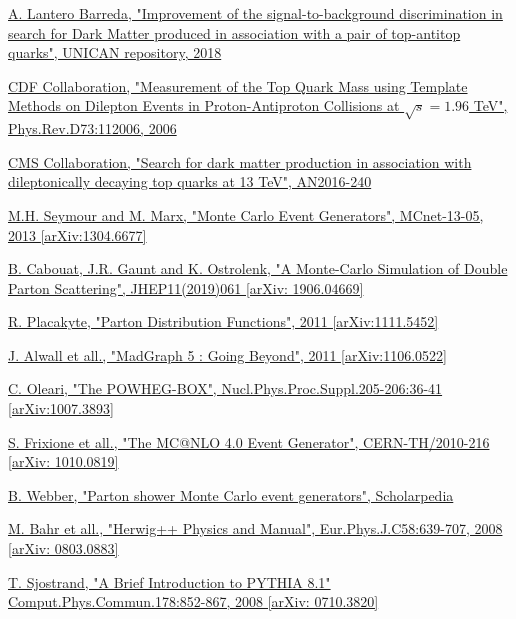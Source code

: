 \documentclass[a4paper, 10pt, openright]{report}
\begin{document}
\begin{thebibliography}{1}
\href{https://repositorio.unican.es/xmlui/bitstream/handle/10902/15648/Lantero\%20Barreda\%20Agustin.pdf}{A. Lantero Barreda,
"Improvement of the signal-to-background discrimination in search for Dark Matter produced in association with a pair of top-antitop quarks",
UNICAN repository, 2018}

\href{https://arxiv.org/abs/hep-ex/0602008}{CDF Collaboration,
"Measurement of the Top Quark Mass using Template Methods on Dilepton Events in Proton-Antiproton Collisions at $\sqrt{s} = 1.96$ TeV",
Phys.Rev.D73:112006, 2006}

\href{http://cms.cern.ch/iCMS/user/noteinfo?cmsnoteid=CMS\%20AN-2016/240}{CMS Collaboration,
"Search for dark matter production in association with dileptonically decaying top quarks at 13 TeV", AN2016-240}

\href{https://arxiv.org/abs/1304.6677}{M.H. Seymour and M. Marx,
"Monte Carlo Event Generators",
MCnet-13-05, 2013 [arXiv:1304.6677]}

\href{https://arxiv.org/abs/1906.04669}{B. Cabouat, J.R. Gaunt and K. Ostrolenk,
"A Monte-Carlo Simulation of Double Parton Scattering",
JHEP11(2019)061 [arXiv: 1906.04669]}

\href{https://arxiv.org/abs/1111.5452}{R. Placakyte,
"Parton Distribution Functions",
2011 [arXiv:1111.5452]}

\href{https://arxiv.org/abs/1106.0522}{J. Alwall et all.,
"MadGraph 5 : Going Beyond",
2011 [arXiv:1106.0522]}

\href{https://arxiv.org/abs/1007.3893}{C. Oleari,
"The POWHEG-BOX",
Nucl.Phys.Proc.Suppl.205-206:36-41 [arXiv:1007.3893]}

\href{https://arxiv.org/abs/1010.0819}{S. Frixione et all.,
"The MC@NLO 4.0 Event Generator",
CERN-TH/2010-216 [arXiv: 1010.0819]}

\href{http://www.scholarpedia.org/article/Parton_shower_Monte_Carlo_event_generators}{B. Webber,
"Parton shower Monte Carlo event generators",
Scholarpedia}

\href{https://arxiv.org/abs/0803.0883}{M. Bahr et all.,
"Herwig++ Physics and Manual",
Eur.Phys.J.C58:639-707, 2008 [arXiv: 0803.0883]}

\href{https://arxiv.org/abs/0710.3820}{T. Sjostrand,
"A Brief Introduction to PYTHIA 8.1"
Comput.Phys.Commun.178:852-867, 2008 [arXiv: 0710.3820]}


\end{thebibliography}
\end{document}
